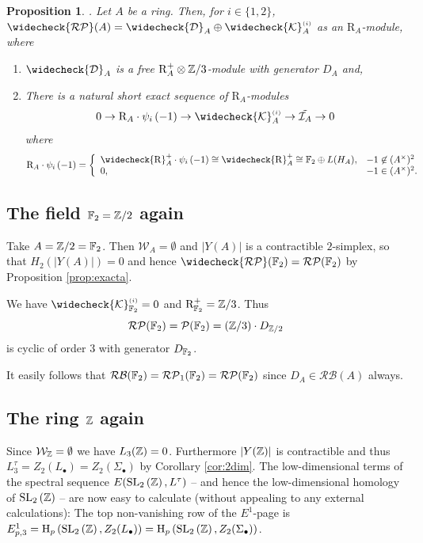 \documentclass[12pt]{amsart}
\newtheorem{prop}[lem]{Proposition}
\theoremstyle{definition}
\newtheorem{exa}[lem]{Example}
\newcommand{\F}[1]{\Bbb{F}_{#1}}
\newcommand{\Z}{\Bbb{Z}}
\newcommand{\K}{\mathcal{K}}
\newcommand{\LL}{L^{\tau}}
\newcommand{\wn}[1]{\mathcal{W}_{#1}}%
\newcommand{\spl}[2]{\operatorname{SL}_{#1}\left(#2\right)}
\newcommand{\pb}[1]{\mathcal{P}(#1)}%
\newcommand{\rpb}[1]{\mathcal{RP}(#1)}%
\newcommand{\rpbker}[1]{\mathcal{RP}_1(#1)}%
\newcommand{\crpb}[1]{\widecheck{\mathcal{RP}}(#1)}
\newcommand{\rbl}[1]{{\mathcal{RB}}(#1)}%
\newcommand{\suss}[2]{\psi_{#1}\left( #2\right)}
\newcommand{\cks}[2]{\widecheck{{\K}}^{\mbox{\tiny $(#1)$}}_{#2}}
\newcommand{\cconst}[1]{D_{#1}}
\newcommand{\ccconstmod}[1]{\widecheck{\mathcal{D}}_{#1}}
\newcommand{\<}{\langle}
\renewcommand{\>}{\rangle}
\newcommand{\psqcl}[1]{\bar{G}_{#1}}%
\newcommand{\sgr}[1]{\mathrm{R}_{#1}}%
\newcommand{\qsgr}[1]{\mathrm{R}^{+}_{#1}} %
\newcommand{\tsgr}[1]{\widecheck{\mathrm{R}}^{+}_{#1}} %
\newcommand{\aug}[1]{\mathcal{I}_{#1}}
\newcommand{\ho}[3]{\mathrm{H}_{#1}\left( #2,#3 \right)}
\begin{document}
\begin{prop}\label{prop:crpbstruct}. Let $A$ be a ring. Then, for $i\in \{ 1,2\}$,  $\crpb{A}=\ccconstmod{A}\oplus\cks{i}{A}$ as an $\sgr{A}$-module, where
\begin{enumerate}
\item $\ccconstmod{A}$ is a free $\qsgr{A}\otimes \Z/3$-module with generator $\cconst{A}$ and,
\item There is a natural short exact sequence of $\sgr{A}$-modules
\[
0\to \sgr{A}\cdot\suss{i}{-1}\to\cks{i}{A}\to \tilde{\aug{A}}\to 0
\]
where 
\[
\sgr{A}\cdot\suss{i}{-1}=
\left\{
\begin{array}{ll}
\tsgr{A}\cdot\suss{i}{-1}\cong\tsgr{A}\cong\F{2}\oplus L(H_A),& -1\not\in (A^\times)^2\\
0,&-1\in (A^\times)^2.
\end{array}
\right.
\]

\end{enumerate}
\end{prop}

\subsection{The field $\F{2}=\Z/2$ again}%

 Take $A=\Z/2=\F{2}$.   Then $\wn{A}=\emptyset$ and $|Y(A)|$ is a contractible $2$-simplex, so that $H_2(|Y(A)|)=0$  and hence $\crpb{\F{2}}=\rpb{\F{2}}$ by Proposition \ref{prop:exacta}. 

We have $\cks{i}{\F{2}}=0$ and 
$\qsgr{\F{2}}=\Z/3$. Thus 
\[
\rpb{\F{2}}=\pb{\F{2}}=(\Z/3)\cdot \cconst{\Z/2}
\]
 is cyclic of order $3$ with generator $\cconst{\F{2}}$.

It easily follows that $\rbl{\F{2}}=\rpbker{\F{2}}=\rpb{\F{2}}$ since $\cconst{A}\in\rbl{A}$ always.


\subsection{The ring $\Z$ again}
 Since $\wn{\Z}=\emptyset$ we have $L_3(\Z)=0$. Furthermore $|Y(\Z)|$ is contractible and thus $\LL_3=Z_2(L_\bullet)= Z_2(\Sigma_\bullet)$ by Corollary \ref{cor:2dim}. 
The low-dimensional terms of the spectral sequence $E(\spl{2}{\Z},\LL)$ -- and hence the low-dimensional homology of $\spl{2}{\Z}$ -- are now easy to calculate (without appealing to any external calculations):
The top non-vanishing row of the $E^1$-page is $E^1_{p,3}=\ho{p}{\spl{2}{\Z}}{Z_2(L_\bullet)}=\ho{p}{\spl{2}{\Z}}{Z_2(\Sigma_\bullet)}$.
\end{document}
